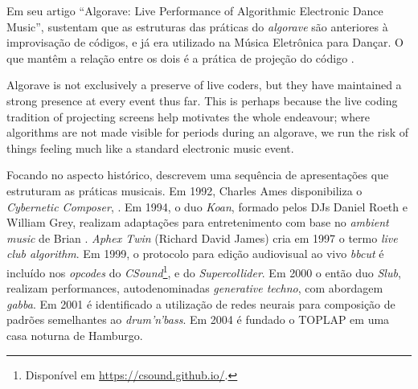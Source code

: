 Em seu artigo ``Algorave: Live Performance of Algorithmic Electronic Dance Music'',  sustentam que as estruturas das práticas do \emph{algorave} são anteriores à improvisação de códigos, e já era utilizado na Música Eletrônica para Dançar. O que mantêm a relação entre os dois é a prática de projeção do código .

\begin{citacao}
{Algorave is not exclusively a preserve of live coders, but they have maintained a strong presence at every event thus far. This is perhaps because the live coding tradition of projecting screens help motivates the whole endeavour; where algorithms are not made visible for periods during an algorave, we run the risk of things feeling much like a standard electronic music event.}

\end{citacao}

Focando no aspecto histórico,  descrevem uma sequência de apresentações que estruturam as práticas musicais. Em 1992, Charles Ames disponibiliza o \emph{Cybernetic Composer}, . Em 1994, o duo \emph{Koan}, formado pelos DJs Daniel Roeth e William Grey, realizam adaptações para entretenimento com base no \emph{ambient music} de Brian . \emph{Aphex Twin} (Richard David James) cria em 1997 o termo \emph{live club algorithm}. Em 1999, o protocolo para edição audiovisual ao vivo \emph{bbcut} \cite{collins_bbcut_2003} é incluído nos \emph{opcodes} do \emph{CSound}\footnote{Disponível em \url{https://csound.github.io/}.}, e do \emph{Supercollider}. Em 2000 o então duo \emph{Slub}, realizam performances, autodenominadas \emph{generative techno}, com abordagem \emph{gabba}. Em 2001 é identificado a utilização de redes neurais para composição de padrões semelhantes ao \emph{drum'n'bass}. Em 2004 é fundado o TOPLAP em uma casa noturna de Hamburgo.


